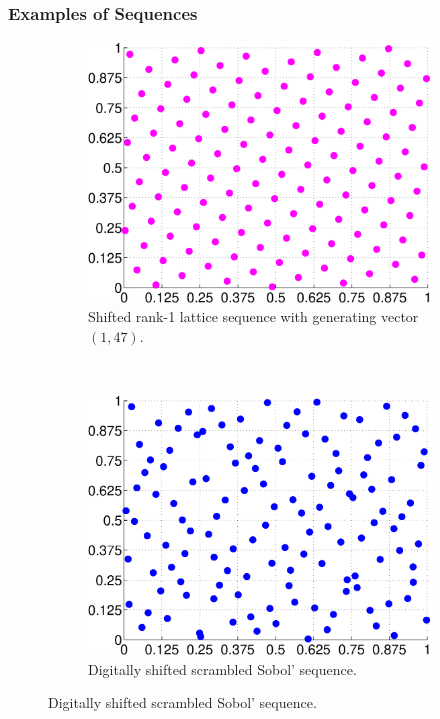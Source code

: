 \documentclass[11pt,compress]{beamer} %
\begin{document}
\begin{frame}
\frametitle{Examples of Sequences}
\begin{figure}\centering
\begin{subfigure}[b]{0.45\textwidth}
\includegraphics[width=1.\textwidth]{Images/lat_seq.eps}
\caption*{Shifted rank-1 lattice sequence with generating vector $(1,47)$.}
\end{subfigure}
~ %
\begin{subfigure}[b]{0.45\textwidth}
\includegraphics[width=1.\textwidth]{Images/sob_seq.eps}
\caption*{Digitally shifted scrambled Sobol' sequence.}
\end{subfigure}
\end{figure}
\end{frame}
\end{document}
